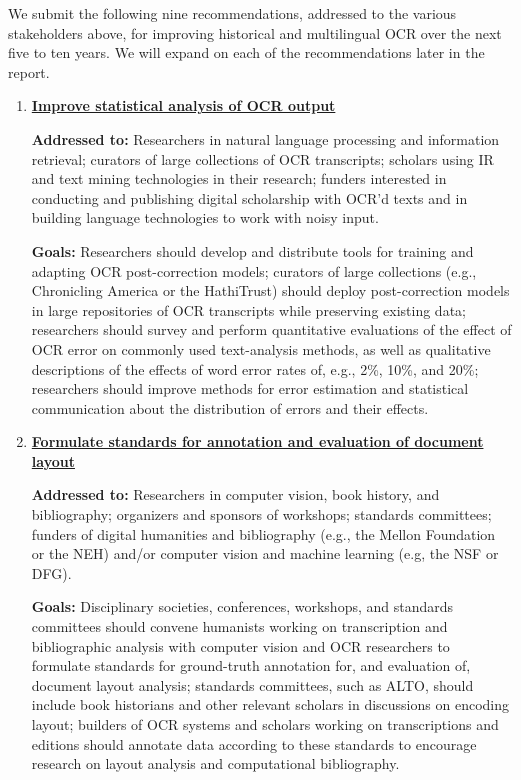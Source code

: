 \documentclass[twoside,11pt]{report}
\begin{document}
We submit the following nine recommendations, addressed to the various stakeholders above, for improving historical and multilingual OCR over the next five to ten years. We will expand on each of the recommendations later in the report.
\begin{enumerate}

\item \hyperref[sec:rec-stats]{\textbf{Improve statistical analysis of OCR output}}

\textbf{Addressed to:} Researchers in natural language processing and information retrieval; curators of large collections of OCR transcripts; scholars using IR and text mining technologies in their research; funders interested in conducting and publishing digital scholarship with OCR'd texts and in building language technologies to work with noisy input.

\textbf{Goals:} Researchers should develop and distribute tools for training and adapting OCR post-correction models; curators of large collections (e.g., Chronicling America or the HathiTrust) should deploy post-correction models in large repositories of OCR transcripts while preserving existing data; researchers should survey and perform quantitative evaluations of the effect of OCR error on commonly used text-analysis methods, as well as qualitative descriptions of the effects of word error rates of, e.g., 2\%, 10\%, and 20\%; researchers should improve methods for error estimation and statistical communication about the distribution of errors and their effects.

\item \hyperref[sec:rec-layout]{\textbf{Formulate standards for annotation and evaluation of document layout}}

\textbf{Addressed to:} Researchers in computer vision, book history, and bibliography; organizers and sponsors of workshops; standards committees; funders of digital humanities and bibliography (e.g., the Mellon Foundation or the NEH) and/or computer vision and machine learning (e.g, the NSF or DFG).

\textbf{Goals:} Disciplinary societies, conferences, workshops, and standards committees should convene humanists working on transcription and bibliographic analysis with computer vision and OCR researchers to formulate standards for ground-truth annotation for, and evaluation of, document layout analysis; standards committees, such as ALTO, should include book historians and other relevant scholars in discussions on encoding layout; builders of OCR systems and scholars working on transcriptions and editions should annotate data according to these standards to encourage research on layout analysis and computational bibliography.


\end{enumerate}
\end{document}
